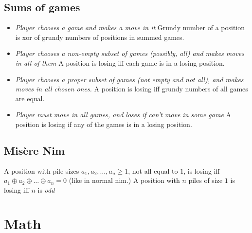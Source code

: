 \documentclass[12pt]{extarticle}
\begin{document}
\begin{multicols*}{2}
\subsection{Sums of games}

\begin{itemize}
  \item
    \emph{Player chooses a game and makes a move in it}
    Grundy number of a position is xor of grundy numbers of positions in summed games.
  \item
    \emph{Player chooses a non-empty subset of games (possibly, all) and makes moves in all of them}
    A position is losing iff each game is in a losing position.
  \item
    \emph{Player chooses a proper subset of games (not empty and not all),
        and makes moves in all chosen ones.}
    A position is losing iff grundy numbers of all games are equal.
  \item
    \emph{Player must move in all games, and loses if can't move in some game}
    A position is losing if any of the games is in a losing position.
\end{itemize}


\subsection{Mis\`{e}re Nim}
A position with pile sizes $a_1, a_2, \dots, a_n \ge 1$,
not all equal to $1$, is losing iff $a_1 \oplus a_2 \oplus \dots \oplus a_n = 0$
(like in normal nim.)
A position with $n$ piles of size $1$ is losing iff $n$ is \emph{odd}



\section{Math}



\end{multicols*}
\end{document}

